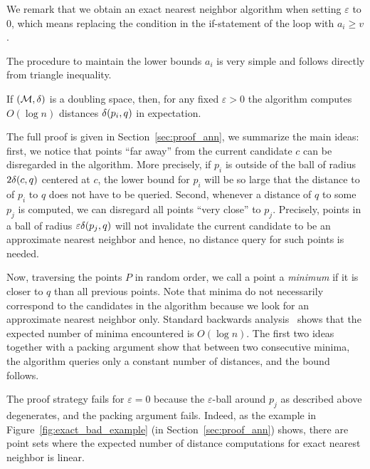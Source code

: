 \documentclass[]{ws-ijcga}
\renewcommand{\geq}{\geqslant}
\newcommand{\eps}{\varepsilon}
\begin{document}
We remark that we obtain an exact nearest neighbor algorithm
when setting $\eps$ to $0$, which means 
replacing the condition in the if-statement of the loop
with $a_i\geq v$.

The procedure to maintain the lower bounds $a_i$
is very simple and follows directly
from triangle inequality.

\begin{algorithmic}
    \EndFor
\EndProcedure
\end{algorithmic}

\begin{theorem}
\label{thm:ann_bound}
    If $(\mathcal{M}, \delta)$ is a doubling space, then, for any fixed $\eps > 0$ the
    algorithm computes $O(\log n)$ distances $\delta(p_i, q)$ in expectation.
\end{theorem}

The full proof is given in Section~\ref{sec:proof_ann},
we summarize the main ideas:
first, we notice that points ``far away'' from the current candidate $c$ 
can be disregarded in the algorithm. More precisely, if $p_i$
is outside of the ball of radius $2\delta(c, q)$ centered at $c$,
the lower bound for $p_i$ will be so large that
the distance to of $p_i$ to $q$ does not have to be queried.
Second, whenever a distance of $q$ to some $p_j$ is computed,
we can disregard all points ``very close'' to $p_j$.
Precisely, points in a ball of radius $\eps\dist(p_j,q)$
will not invalidate the current candidate 
to be an approximate nearest neighbor and hence,
no distance query for such points is needed.

Now, traversing the points $P$ in random order,
we call a point a \emph{minimum} if it is closer to $q$
than all previous points. Note that minima do not necessarily
correspond to the candidates in the algorithm because
we look for an approximate nearest neighbor only.
Standard backwards analysis~\cite{seidel-backwards}
shows that the expected number of minima encountered is $O(\log n)$.
The first two ideas together with a packing argument show
that between two consecutive minima, 
the algorithm queries only a constant number of distances,
and the bound follows.

The proof strategy fails for $\eps=0$ because the $\eps$-ball
around $p_j$ as described above degenerates, and the packing argument fails.
Indeed, as the example in Figure~\ref{fig:exact_bad_example} (in Section~\ref{sec:proof_ann}) 
shows, there are point sets where the expected number
of distance computations for exact nearest neighbor is linear.
\end{document}
